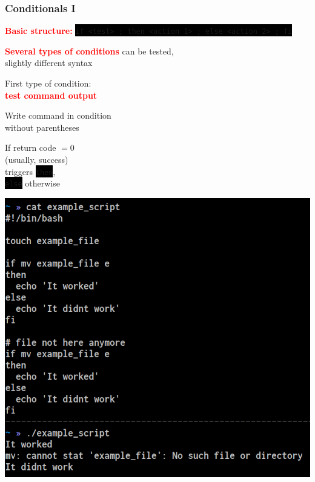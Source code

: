 \documentclass[unknownkeysallowed, 10pt, a4 paper, handout]{beamer}
\newcommand{\focus}[1]{\textbf{\textcolor{red}{#1}}}
\newcommand{\code}[1]{\colorbox{black}{\color{green}\texttt{#1}}}
\newcommand{\sidebyside}[5]{
  \begin{minipage}{#1\textwidth}
    #2
  \end{minipage} #3 \begin{minipage}{#4\textwidth}
    #5
  \end{minipage}
}
\begin{document}
\begin{frame}
  \begin{center}
    \frametitle{Conditionals I}

    \focus{Basic structure:}
    \code{if <test> ; then <action 1> ; else <action 2> ; fi}

    \vspace{2mm}

    \focus{Several types of conditions} can be tested,\\
    slightly different syntax

    \vspace{2mm}

    \sidebyside{0.48}{
      \centering
      First type of condition:\\
      \focus{test command output}

      \vspace{3mm}
  
      Write command in condition\\
      without parentheses

      \vspace{3mm}
  
      If return code $= 0$\\
      (usually, success)\\
      triggers \code{then},\\
      \code{else} otherwise
    }{\hfill}{0.47}{
      \begin{center}
        \includegraphics[width=1.00\textwidth]{pics/conditional_1.png}
      \end{center}
    }
  \end{center}
\end{frame}
\end{document}

